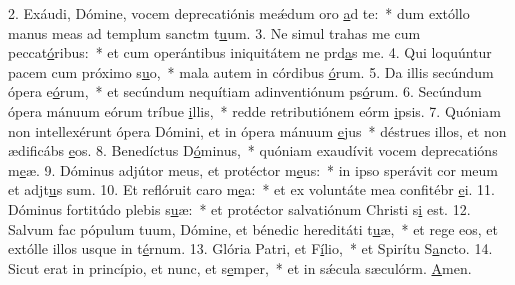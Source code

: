 2. Exáudi, Dómine, vocem deprecatiónis meǽdum oro \uline{a}d te:~* dum extóllo manus meas ad templum sanctm t\uline{u}um.
3. Ne simul trahas me cum peccat\uline{ó}ribus:~* et cum operántibus iniquitátem ne prd\uline{a}s me.
4. Qui loquúntur pacem cum próximo s\uline{u}o,~* mala autem in córdibus \uline{ó}rum.
5. Da illis secúndum ópera e\uline{ó}rum,~* et secúndum nequítiam adinventiónum ps\uline{ó}rum.
6. Secúndum ópera mánuum eórum tríbue \uline{i}llis,~* redde retributiónem eórm \uline{i}psis.
7. Quóniam non intellexérunt ópera Dómini, et in ópera mánuum \uline{e}jus~* déstrues illos, et non ædificábs \uline{e}os.
8. Benedíctus D\uline{ó}minus,~* quóniam exaudívit vocem deprecatións m\uline{e}æ.
9. Dóminus adjútor meus, et protéctor m\uline{e}us:~* in ipso sperávit cor meum et adjt\uline{u}s sum.
10. Et reflóruit caro m\uline{e}a:~* et ex voluntáte mea confitébr \uline{e}i.
11. Dóminus fortitúdo plebis s\uline{u}æ:~* et protéctor salvatiónum Christi s\uline{i} est.
12. Salvum fac pópulum tuum, Dómine, et bénedic hereditáti t\uline{u}æ,~* et rege eos, et extólle illos usque in t\uline{é}rnum.
13. Glória Patri, et F\uline{í}lio,~* et Spirítu S\uline{a}ncto.
14. Sicut erat in princípio, et nunc, et s\uline{e}mper,~* et in sǽcula sæculórm. \uline{A}men.
